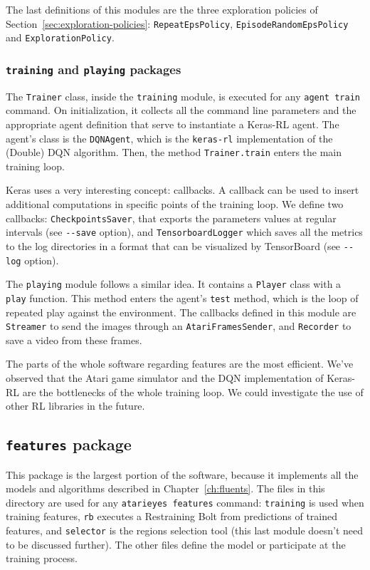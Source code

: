 The last definitions of this modules are the three exploration policies of
Section~\ref{sec:exploration-policies}: \texttt{RepeatEpsPolicy},
\texttt{EpisodeRandomEpsPolicy} and \texttt{ExplorationPolicy}.


\subsubsection*{\texttt{training} and \texttt{playing} packages}

The \texttt{Trainer} class, inside the \texttt{training} module, is executed
for any \verb|agent train| command. On initialization, it collects all the
command line parameters and the appropriate agent definition that serve to
instantiate a Keras-RL agent. The agent's class is the \texttt{DQNAgent},
which is the \texttt{keras-rl} implementation of the (Double) DQN algorithm.
Then, the method \verb|Trainer.train| enters the main training loop.

Keras uses a very interesting concept: callbacks. A callback can be used to
insert additional computations in specific points of the training loop.  We
define two callbacks: \texttt{CheckpointsSaver}, that exports the parameters
values at regular intervals (see \verb|--save| option), and
\texttt{TensorboardLogger} which saves all the metrics to the log directories
in a format that can be visualized by TensorBoard (see \verb|--log| option).

The \texttt{playing} module follows a similar idea. It contains a
\texttt{Player} class with a \texttt{play} function. This method enters the
agent's \texttt{test} method, which is the loop of repeated play against the
environment. The callbacks defined in this module are \texttt{Streamer} to
send the images through an \texttt{AtariFramesSender}, and \texttt{Recorder}
to save a video from these frames.

The parts of the whole software regarding features are the most efficient.
We've observed that the Atari game simulator and the DQN implementation of
Keras-RL are the bottlenecks of the whole training loop. We could investigate
the use of other RL libraries in the future.


\subsection{\texttt{features} package}

This package is the largest portion of the software, because it implements all
the models and algorithms described in Chapter~\ref{ch:fluents}. The files in
this directory are used for any \verb|atarieyes features| command:
\texttt{training} is used when training features, \texttt{rb} executes a
Restraining Bolt from predictions of trained features, and \texttt{selector}
is the regions selection tool (this last module doesn't need to be discussed
further).  The other files define the model or participate at the training
process.


